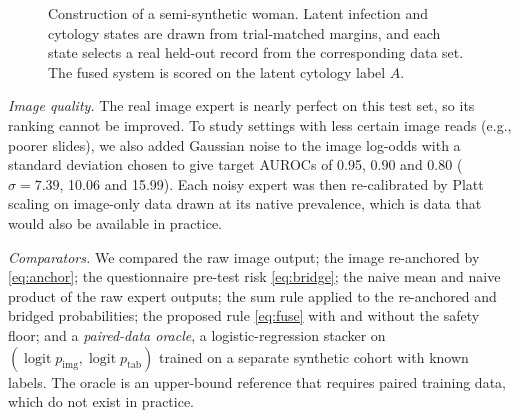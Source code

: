 \documentclass[lettersize,journal]{IEEEtran}
\newcommand{\logit}{\operatorname{logit}}
\newcommand{\pimg}{p_{\mathrm{img}}}
\newcommand{\ptab}{p_{\mathrm{tab}}}
\begin{document}
\begin{figure}[t]
\centering
{%
}
\caption{Construction of a semi-synthetic woman. Latent infection and cytology states are drawn from trial-matched margins, and each state selects a real held-out record from the corresponding data set. The fused system is scored on the latent cytology label $A$.}
\label{fig:synth}
\end{figure}

\emph{Image quality.} The real image expert is nearly perfect on this test set, so its ranking cannot be improved. To study settings with less certain image reads (e.g., poorer slides), we also added Gaussian noise to the image log-odds with a standard deviation chosen to give target AUROCs of 0.95, 0.90 and 0.80 ($\sigma=7.39$, 10.06 and 15.99). Each noisy expert was then re-calibrated by Platt scaling \cite{platt1999probabilistic} on image-only data drawn at its native prevalence, which is data that would also be available in practice.

\emph{Comparators.} We compared the raw image output; the image re-anchored by \eqref{eq:anchor}; the questionnaire pre-test risk \eqref{eq:bridge}; the naive mean and naive product of the raw expert outputs; the sum rule \cite{kittler1998combining} applied to the re-anchored and bridged probabilities; the proposed rule \eqref{eq:fuse} with and without the safety floor; and a \emph{paired-data oracle}, a logistic-regression stacker on $(\logit\pimg,\logit\ptab)$ trained on a separate synthetic cohort with known labels. The oracle is an upper-bound reference that requires paired training data, which do not exist in practice.
\end{document}
